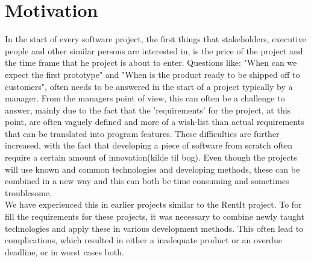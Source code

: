 \section{Motivation}
In the start of every software project, the first things that stakeholders, executive people and other similar persons are interested in, is the price of the project and the time frame that he project is about to enter. Questions like: "When can we expect the first prototype" and "When is the product ready to be shipped off to customers", often needs to be answered in the start of a project typically by a manager. From the managers point of view, this can often be a challenge to answer, mainly due to the fact that the 'requirements' for the project, at this point, are often vaguely defined and more of a wish-list than actual requirements that can be translated into program features. These difficulties are further increased, with the fact that developing a piece of software from scratch often require a certain amount of innovation(kilde til bog). Even though the projects will use known and common technologies and developing methods, these can be combined in a new way and this can both be time consuming and sometimes troublesome.\\ We have experienced this in earlier projects similar to the RentIt project. To for fill the requirements for these projects, it was necessary to combine newly taught technologies and apply these in various development methods. This often lead to  complications, which resulted in either a inadequate product or an overdue deadline, or in worst cases both.\\   

